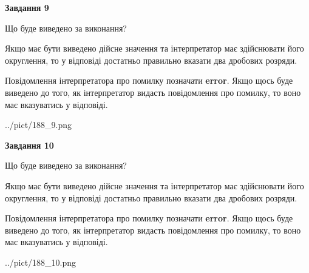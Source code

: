\documentclass[12pt, ukrainian]{article}
\begin{document}
{\begin {Large}
{\begin {center}\textbf{Завдання 9}\end {center}}\par
Що буде виведено за виконання? \par

Якщо має бути виведено дійсне значення та інтерпретатор має здійснювати його округлення, 
то у відповіді достатньо правильно вказати два дробових розряди.

Повідомлення інтерпретатора про помилку позначати \textbf{error}.
Якщо щось буде виведено до того, як інтерпретатор видасть повідомлення про помилку, 
то воно має вказуватись у відповіді. \par

\begin{center}
	{../pict/188_9.png}
\end{center}
\newpage

{\begin {center}\textbf{Завдання 10}\end {center}}\par
Що буде виведено за виконання? \par

Якщо має бути виведено дійсне значення та інтерпретатор має здійснювати його округлення, 
то у відповіді достатньо правильно вказати два дробових розряди.

Повідомлення інтерпретатора про помилку позначати \textbf{error}.
Якщо щось буде виведено до того, як інтерпретатор видасть повідомлення про помилку, 
то воно має вказуватись у відповіді. \par

\begin{center}
	{../pict/188_10.png}
\end{center}
\newpage

\end {Large}}
\end{document}
